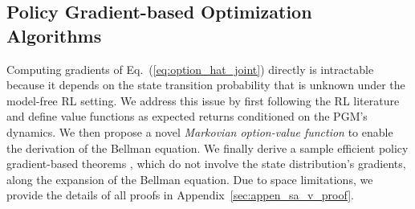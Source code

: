 \documentclass[10pt,journal,compsoc]{IEEEtran}
\renewcommand{\cite}{\citep}
\begin{document}
\subsection{Policy Gradient-based Optimization Algorithms}
\label{sec:pgm_opt}

Computing gradients of
Eq.~(\ref{eq:option_hat_joint}) directly is intractable because it
depends on the state transition probability that is unknown under
the model-free RL setting. We address this issue
by first following the RL literature
\cite{sutton2018reinforcement} and define value functions as
expected returns conditioned on the PGM's dynamics. We then
propose a novel \emph{Markovian option-value function} to enable
the derivation of the Bellman equation. We finally derive a
sample efficient policy gradient-based theorems
\cite{sutton2018reinforcement}, which do not involve the state
distribution's gradients, along the expansion of the Bellman
equation. Due to space limitations, we provide the details of all proofs in Appendix~\ref{sec:appen_sa_v_proof}.
\end{document}
